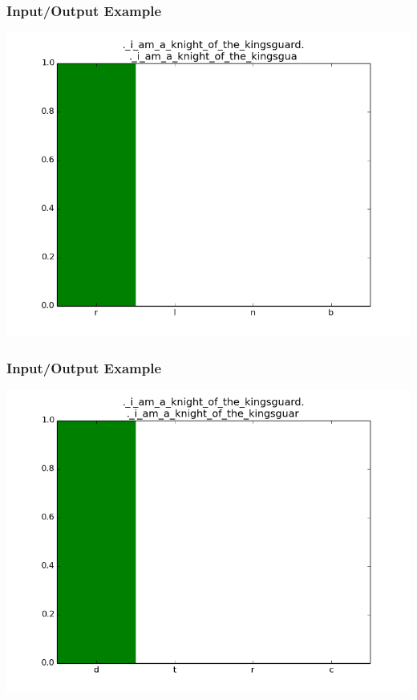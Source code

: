 \documentclass[12]{beamer}
\begin{document}
\begin{frame}
\frametitle{Input/Output Example}
\begin{center}
\includegraphics[scale=0.4]{../distplot/30.png}
\end{center}
\end{frame}

\begin{frame}
\frametitle{Input/Output Example}
\begin{center}
\includegraphics[scale=0.4]{../distplot/31.png}
\end{center}
\end{frame}
\end{document}

